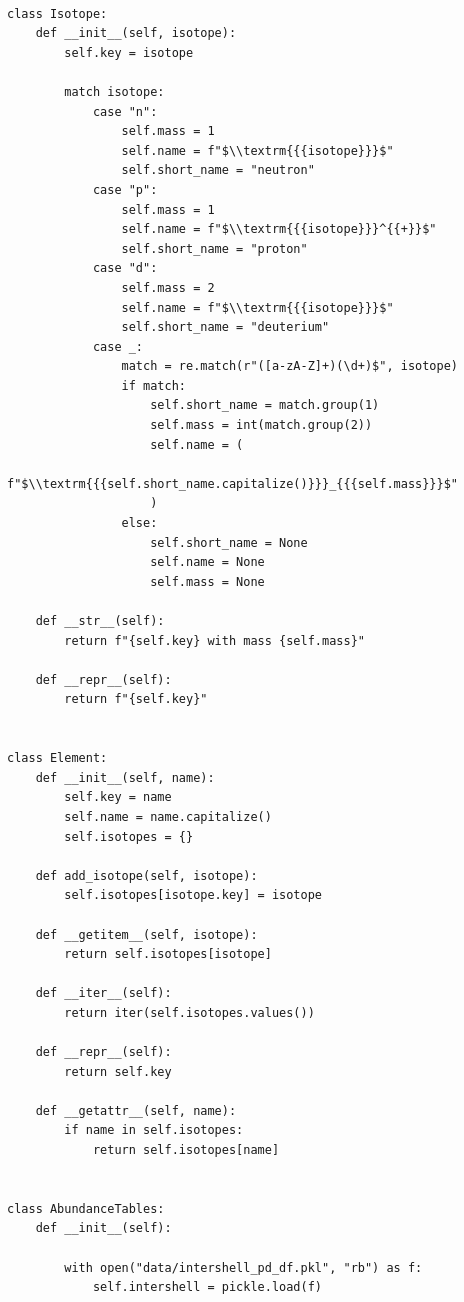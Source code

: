 \documentclass[a4paper,10pt]{article}
\begin{document}
\begin{verbatim}

class Isotope:
    def __init__(self, isotope):
        self.key = isotope

        match isotope:
            case "n":
                self.mass = 1
                self.name = f"$\\textrm{{{isotope}}}$"
                self.short_name = "neutron"
            case "p":
                self.mass = 1
                self.name = f"$\\textrm{{{isotope}}}^{{+}}$"
                self.short_name = "proton"
            case "d":
                self.mass = 2
                self.name = f"$\\textrm{{{isotope}}}$"
                self.short_name = "deuterium"
            case _:
                match = re.match(r"([a-zA-Z]+)(\d+)$", isotope)
                if match:
                    self.short_name = match.group(1)
                    self.mass = int(match.group(2))
                    self.name = (
                        f"$\\textrm{{{self.short_name.capitalize()}}}_{{{self.mass}}}$"
                    )
                else:
                    self.short_name = None
                    self.name = None
                    self.mass = None

    def __str__(self):
        return f"{self.key} with mass {self.mass}"

    def __repr__(self):
        return f"{self.key}"


class Element:
    def __init__(self, name):
        self.key = name
        self.name = name.capitalize()
        self.isotopes = {}

    def add_isotope(self, isotope):
        self.isotopes[isotope.key] = isotope

    def __getitem__(self, isotope):
        return self.isotopes[isotope]

    def __iter__(self):
        return iter(self.isotopes.values())

    def __repr__(self):
        return self.key

    def __getattr__(self, name):
        if name in self.isotopes:
            return self.isotopes[name]


class AbundanceTables:
    def __init__(self):

        with open("data/intershell_pd_df.pkl", "rb") as f:
            self.intershell = pickle.load(f)


\end{verbatim}
\end{document}
